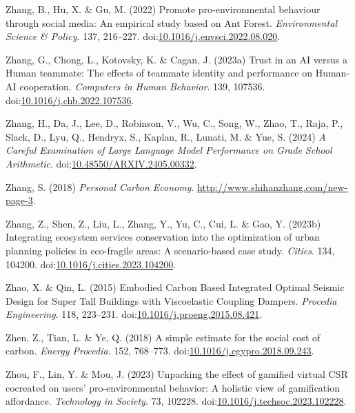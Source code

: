 \documentclass[
  letterpaper,
  DIV=11,
  numbers=noendperiod]{scrartcl}
\newlength{\cslhangindent}
\newenvironment{CSLReferences}[2] %
 {\begin{list}{}{%
  \setlength{\itemindent}{0pt}
  \setlength{\leftmargin}{0pt}
  \setlength{\parsep}{0pt}
  \ifodd #1
   \setlength{\leftmargin}{\cslhangindent}
   \setlength{\itemindent}{-1\cslhangindent}
  \fi
  \setlength{\itemsep}{#2\baselineskip}}}
 {\end{list}}
\begin{document}
\begin{CSLReferences}{0}{1}
Zhang, B., Hu, X. \& Gu, M. (2022) Promote pro-environmental behaviour
through social media: {An} empirical study based on {Ant Forest}.
\emph{Environmental Science \& Policy}. 137, 216--227.
doi:\href{https://doi.org/10.1016/j.envsci.2022.08.020}{10.1016/j.envsci.2022.08.020}.

Zhang, G., Chong, L., Kotovsky, K. \& Cagan, J. (2023a) Trust in an {AI}
versus a {Human} teammate: {The} effects of teammate identity and
performance on {Human-AI} cooperation. \emph{Computers in Human
Behavior}. 139, 107536.
doi:\href{https://doi.org/10.1016/j.chb.2022.107536}{10.1016/j.chb.2022.107536}.

Zhang, H., Da, J., Lee, D., Robinson, V., Wu, C., Song, W., Zhao, T.,
Raja, P., Slack, D., Lyu, Q., Hendryx, S., Kaplan, R., Lunati, M. \&
Yue, S. (2024) \emph{A {Careful Examination} of {Large Language Model
Performance} on {Grade School Arithmetic}}.
doi:\href{https://doi.org/10.48550/ARXIV.2405.00332}{10.48550/ARXIV.2405.00332}.

Zhang, S. (2018) \emph{Personal {Carbon Economy}}.
\url{http://www.shihanzhang.com/new-page-3}.

Zhang, Z., Shen, Z., Liu, L., Zhang, Y., Yu, C., Cui, L. \& Gao, Y.
(2023b) Integrating ecosystem services conservation into the
optimization of urban planning policies in eco-fragile areas: {A}
scenario-based case study. \emph{Cities}. 134, 104200.
doi:\href{https://doi.org/10.1016/j.cities.2023.104200}{10.1016/j.cities.2023.104200}.

Zhao, X. \& Qin, L. (2015) Embodied {Carbon Based Integrated Optimal
Seismic Design} for {Super Tall Buildings} with {Viscoelastic Coupling
Dampers}. \emph{Procedia Engineering}. 118, 223--231.
doi:\href{https://doi.org/10.1016/j.proeng.2015.08.421}{10.1016/j.proeng.2015.08.421}.

Zhen, Z., Tian, L. \& Ye, Q. (2018) A simple estimate for the social
cost of carbon. \emph{Energy Procedia}. 152, 768--773.
doi:\href{https://doi.org/10.1016/j.egypro.2018.09.243}{10.1016/j.egypro.2018.09.243}.

Zhou, F., Lin, Y. \& Mou, J. (2023) Unpacking the effect of gamified
virtual {CSR} cocreated on users' pro-environmental behavior: {A}
holistic view of gamification affordance. \emph{Technology in Society}.
73, 102228.
doi:\href{https://doi.org/10.1016/j.techsoc.2023.102228}{10.1016/j.techsoc.2023.102228}.


\end{CSLReferences}
\end{document}
